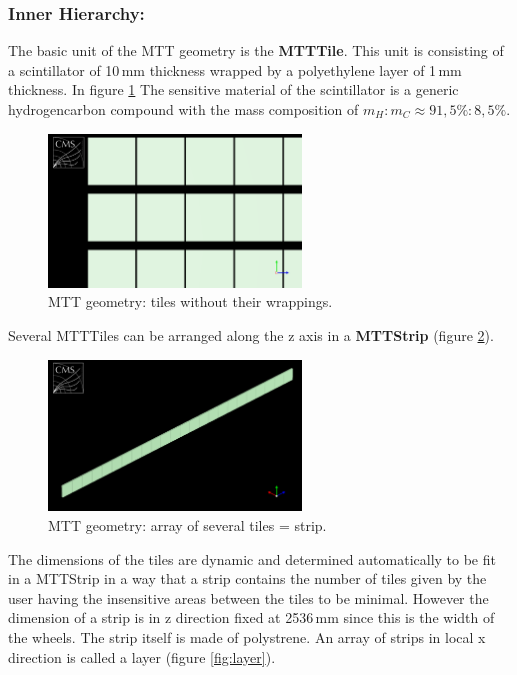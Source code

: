 		\subsubsection*{Inner Hierarchy:}
		The basic unit of the MTT geometry is the \textbf{MTTTile}.
		This unit is consisting of a scintillator of 10\,mm thickness wrapped by a polyethylene layer of 1\,mm thickness.
		In figure \ref{fig:tile_wowrapping}
		The sensitive material of the scintillator is a generic hydrogencarbon compound with the mass composition of $m_H:m_C \approx 91,5\%:8,5\%$.
		\begin{figure}[htbp]
			\centering
			\includegraphics[width=0.6\textwidth]{Figures/erdogan/tile_wowrapping.png}
			\caption{MTT geometry: tiles without their wrappings.}
			\label{fig:tile_wowrapping}
		\end{figure}
		Several MTTTiles can be arranged along the z axis in a \textbf{MTTStrip} (figure \ref{fig:strip}).
		\begin{figure}[htbp]
			\centering
			\includegraphics[width=0.6\textwidth]{Figures/erdogan/strip.png}
			\caption{MTT geometry: array of several tiles = strip.}
			\label{fig:strip}
		\end{figure}
		The dimensions of the tiles are dynamic and determined automatically to be fit in a MTTStrip in a way that a strip contains the number of tiles given by the user having the insensitive areas
		between the tiles to be minimal.
		However the dimension of a strip is in z direction fixed at 2536\,mm since this is the width of the wheels. 
		The strip itself is made of polystrene.
		An array of strips in local x direction is called a layer (figure \ref{fig:layer}).
